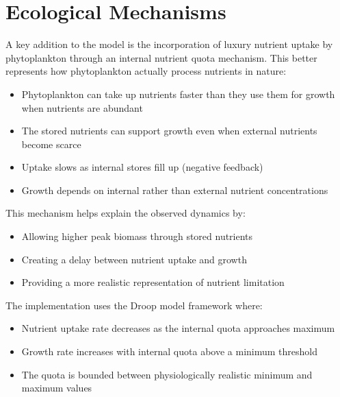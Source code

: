 \section{Ecological Mechanisms}

A key addition to the model is the incorporation of luxury nutrient uptake by phytoplankton through an internal nutrient quota mechanism. This better represents how phytoplankton actually process nutrients in nature:

\begin{itemize}
\item Phytoplankton can take up nutrients faster than they use them for growth when nutrients are abundant
\item The stored nutrients can support growth even when external nutrients become scarce
\item Uptake slows as internal stores fill up (negative feedback)
\item Growth depends on internal rather than external nutrient concentrations
\end{itemize}

This mechanism helps explain the observed dynamics by:
\begin{itemize}
\item Allowing higher peak biomass through stored nutrients
\item Creating a delay between nutrient uptake and growth
\item Providing a more realistic representation of nutrient limitation
\end{itemize}

The implementation uses the Droop model framework where:
\begin{itemize}
\item Nutrient uptake rate decreases as the internal quota approaches maximum
\item Growth rate increases with internal quota above a minimum threshold
\item The quota is bounded between physiologically realistic minimum and maximum values
\end{itemize}
